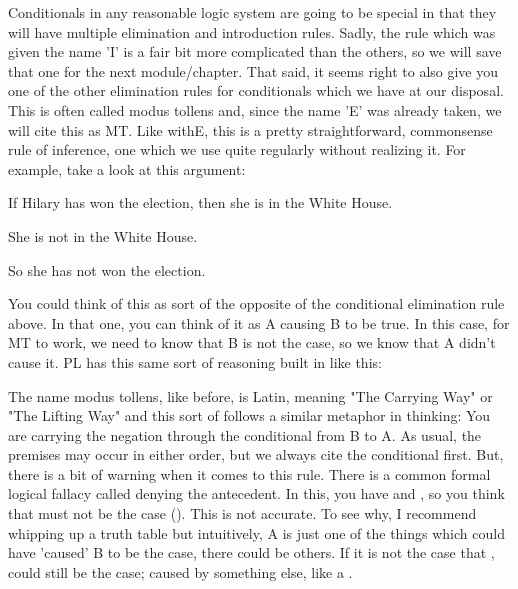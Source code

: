 Conditionals in any reasonable logic system are going to be special in that they will have multiple elimination and introduction rules. Sadly, the rule which was given the name '\eif I' is a fair bit more complicated than the others, so we will save that one for the next module/chapter. That said, it seems right to also give you one of the other elimination rules for conditionals which we have at our disposal. This is often called modus tollens and, since the name '\eif E' was already taken, we will cite this as MT. Like with\eif E, this is a pretty straightforward, commonsense rule of inference, one which we use quite regularly without realizing it. For example, take a look at this argument:
\begin{earg}
\item[]If Hilary has won the election, then she is in the White House.
\item[]She is not in the White House.
\item[]So she has not won the election.
\end{earg}
You could think of this as sort of the opposite of the conditional elimination rule above. In that one, you can think of it as A causing B to be true. In this case, for MT to work, we need to know that B is not the case, so we know that A didn't cause it. PL has this same sort of reasoning built in like this:


The name modus tollens, like before, is Latin, meaning "The Carrying Way" or "The Lifting Way" and this sort of follows a similar metaphor in thinking: You are carrying the negation through the conditional from B to A. As usual, the premises may occur in either order, but we always cite the conditional first. But, there is a bit of warning when it comes to this rule. There is a common formal logical fallacy called denying the antecedent. In this, you have \eif {} and \enot {}, so you think that  must not be the case (\enot {}). This is not accurate. To see why, I recommend whipping up a truth table but intuitively, A is just one of the things which could have 'caused' B to be the case, there could be others. If it is not the case that ,  could still be the case; caused by something else, like a .


